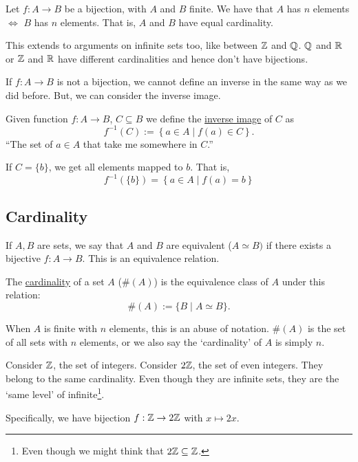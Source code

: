 \begin{remark}
    Let $f: A\to B$ be a bijection, with $A$ and $B$ finite. We have that $A$ has $n$ elements $\iff$ $B$ has $n$ elements. That is, $A$ and $B$ have equal cardinality.

    This extends to arguments on infinite sets too, like between $\mathbb Z$ and $\mathbb Q$. $\mathbb Q$ and $\mathbb R$ or $\mathbb Z$ and $\mathbb R$ have different cardinalities and hence don't have bijections.
\end{remark}

If $f: A\to B$ is not a bijection, we cannot define an inverse in the same way as we did before. But, we can consider the inverse image.

\begin{definition}
    Given function $f: A\to B$, $C\subseteq B$ we define the \ul{inverse image} of $C$ as
    \[f^{-1}(C) := \left\{ a\in A\mid f(a)\in C \right\}.\]
    ``The set of $a\in A$ that take me somewhere in $C$.''
\end{definition}

If $C = \{b\}$, we get all elements mapped to $b$. That is,
\[f^{-1}(\{b\}) = \left\{ a\in A\mid f(a) = b \right\}\]

\subsection{Cardinality}
\begin{definition}[Cardinality]
    If $A, B$ are sets, we say that $A$ and $B$ are equivalent ($A\simeq B)$ if there exists a bijective $f: A\to B$. This is an equivalence relation.

    The \ul{cardinality} of a set $A$ ($\#(A)$) is the equivalence class of $A$ under this relation:
    \[\#(A) := \{B\mid A\simeq B\}.\]
\end{definition}

\begin{remark}
    When $A$ is finite with $n$ elements, this is an abuse of notation. $\#(A)$ is the set of all sets with $n$ elements, or we also say the `cardinality' of $A$ is simply $n$.
\end{remark}

\begin{example}
    Consider $\mathbb Z$, the set of integers. Consider $2\mathbb Z$, the set of even integers. They belong to the same cardinality. Even though they are infinite sets, they are the `same level' of infinite\footnote{Even though we might think that $2\mathbb Z\subseteq \mathbb Z$.}.

    Specifically, we have bijection $f: \mathbb Z\to 2\mathbb Z$ with $x\mapsto 2x$.
\end{example}

